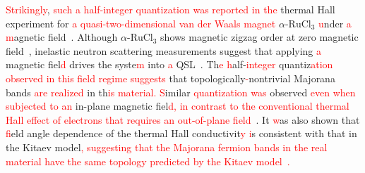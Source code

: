 \documentclass[twocolumn,superscriptaddress,showpacs, longbibliography, aps, prb]{revtex4-2}
\newcommand{\red}[1]{\textcolor{red}{#1}}
\newcommand{\orange}[1]{\textcolor{orange}{#1}}
\begin{document}

\red{Strikingly}, \red{such a half-integer quantization was reported in the} %
thermal Hall experiment for \red{a quasi-two-dimensional van der Waals magnet} $\alpha$-$\mathrm{RuCl_3}$ 
\red{u}nder \red{a %
m}agnetic field~\cite{Kasahara_Nature2018}.
Although $\alpha$-$\mathrm{RuCl_3}$ shows magnetic zigzag order at zero magnetic field~{\cite{Sears_PRB2015,Williams_PRB2015,Cao_PRB2016}}, 
inelastic neutron scattering measurements %
suggest that applying \red{a} magnetic fiel\red{d} %
drives the syste\red{m} %
into
\red{a} QSL~\cite{Banerjee_npjQ2018}.
Th\red{e %
h}alf-\red{integer} quantiz\red{ation observed in this field regime} %
\red{suggests} that topologically\red{-}nontrivial Majorana bands %
\red{are realized} in th\red{is material. %
S}imilar %
\red{quantization was} observed %
\red{even when subjected to an} in-plane magnetic fiel\red{d, %
in contrast to the conventional thermal Hall effect of electrons that requires an out-of-plane field~\cite{Yamashita_PRB2020,Bruin_NPhys2022}}.
It %
\red{w}as also shown that %
\red{f}ield angle dependence of the thermal Hall conductivit\red{y
i}s consistent with %
that in the Kitaev model\red{, suggesting that the Majorana fermion bands in the real material have the same topology predicted by the Kitaev model}~\cite{Yokoi_Science2021}\red{.}
\end{document}
